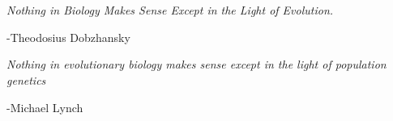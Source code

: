 \chapter*{}
\begin{center}
{\it Nothing in Biology Makes Sense Except in the Light of Evolution.}
\end{center}
\begin{flushright}
-Theodosius Dobzhansky
\end{flushright}
\hspace{1cm}
\hspace{1cm}
\begin{center}
{\it Nothing in evolutionary biology makes sense except in the light of population genetics}
\end{center}
\begin{flushright}
-Michael Lynch
\end{flushright}